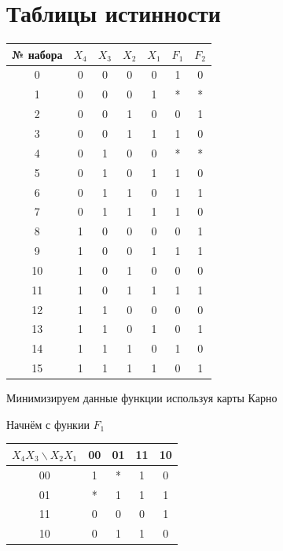 \documentclass[a4paper, 14pt]{article}
\begin{document}
\section{Таблицы истинности}

\begin{center}
  \begin{tabular}{|c|c|c|c|c|c|c|}
    \hline
    № набора & \(X_4\) & \(X_3\) & \(X_2\) & \(X_1\) & \(F_1\) & \(F_2\) \\
    \hline
    0   & 0 & 0 & 0 & 0 & 1 & 0 \\
    \hline
    1   & 0 & 0 & 0 & 1 & * & * \\
    \hline
    2   & 0 & 0 & 1 & 0 & 0 & 1 \\
    \hline
    3   & 0 & 0 & 1 & 1 & 1 & 0 \\
    \hline
    4   & 0 & 1 & 0 & 0 & * & * \\
    \hline
    5   & 0 & 1 & 0 & 1 & 1 & 0 \\
    \hline
    6   & 0 & 1 & 1 & 0 & 1 & 1 \\
    \hline
    7   & 0 & 1 & 1 & 1 & 1 & 0 \\
    \hline
    8   & 1 & 0 & 0 & 0 & 0 & 1 \\
    \hline
    9   & 1 & 0 & 0 & 1 & 1 & 1 \\
    \hline
    10  & 1 & 0 & 1 & 0 & 0 & 0 \\
    \hline
    11  & 1 & 0 & 1 & 1 & 1 & 1 \\
    \hline
    12  & 1 & 1 & 0 & 0 & 0 & 0 \\
    \hline
    13  & 1 & 1 & 0 & 1 & 0 & 1 \\
    \hline
    14  & 1 & 1 & 1 & 0 & 1 & 0 \\
    \hline
    15  & 1 & 1 & 1 & 1 & 0 & 1 \\
    \hline
  \end{tabular}
\end{center}

Минимизируем данные функции используя карты Карно

Начнём с функии $F_1$
\begin{center}
  \begin{tabular}{|c|c|c|c|c|}
    \hline
    \(X_4 X_3 \backslash X_2 X_1\) & 00 & 01 & 11 & 10 \\
    \hline
    00 & 1  & *  & 1  & 0  \\
    \hline
    01 & *  & 1  & 1  & 1  \\
    \hline
    11 & 0  & 0  & 0  & 1  \\
    \hline
    10 & 0  & 1  & 1  & 0  \\
    \hline
  \end{tabular}
\end{center}
\end{document}
